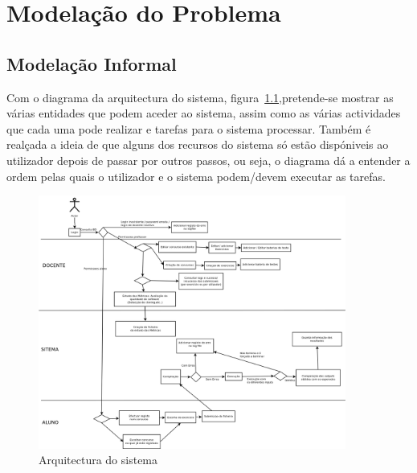 \newcommand{\rarrow}{\rightarrow}
\newcommand{\larrow}{\leftarrow}
\newcommand{\unif}{\sim}
\def\prop#1#2#3{\noindent\\$\begin{array}{l} \{#1\} \\ #2 \\ \{#3\} \\ \end{array}$\\\\}

\chapter{Modelação do Problema} \label{chap modprob}


\section{Modelação Informal}\label{sec modinf}
Com o diagrama da arquitectura do sistema, figura~\ref{fig diaact},pretende-se mostrar as várias entidades que podem aceder ao sistema, assim como as várias
actividades que cada uma pode realizar e tarefas para o sistema processar.
Também é realçada a ideia de que alguns dos recursos do sistema só estão dispóniveis ao utilizador depois 
de passar por outros passos, ou seja, o diagrama dá a entender a ordem pelas quais o utilizador e o sistema podem/devem executar as tarefas.\\

\begin{figure}[htbp]
\begin{center}
\includegraphics[width=0.9\textwidth]{Images/EL-PI}
\caption{Arquitectura do sistema}\label{fig diaact}
\end{center}
\end{figure}

